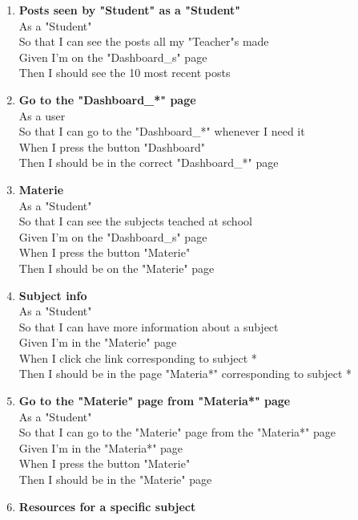 \documentclass[Lau, binding=0.6cm, oneside]{sapthesis}
\begin{document}
\begin{enumerate}
	\item \textbf{Posts seen by "Student" as a "Student"}\\
			As a "Student"\\
			So that I can see the posts all my "Teacher"s made\\
			Given I’m on the "Dashboard\_s" page\\
			Then I should see the 10 most recent posts\\
	\item \textbf{Go to the "Dashboard\_*" page}\\
			As a user\\
			So that I can go to the "Dashboard\_*" whenever I need it\\
			When I press the button "Dashboard"\\
			Then I should be in the correct "Dashboard\_*" page\\
	\item \textbf{Materie}\\
			As a "Student"\\
			So that I can see the subjects teached at school\\
			Given I’m on the "Dashboard\_s" page\\
			When I press the button "Materie"\\
			Then I should be on the "Materie" page\\
	\item \textbf{Subject info}\\
			As a "Student"\\
			So that I can have more information about a subject\\
			Given I’m in the "Materie" page\\
			When I click che link corresponding to subject *\\
			Then I should be in the page "Materia*" corresponding to subject *\\
	\item \textbf{Go to the "Materie" page from "Materia*" page}\\
			As a "Student"\\
			So that I can go to the "Materie" page from the "Materia*" page\\
			Given I’m in the "Materia*" page\\
			When I press the button "Materie"\\
			Then I should be in the "Materie" page\\
	\item \textbf{Resources for a specific subject}\\

\end{enumerate}
\end{document}

